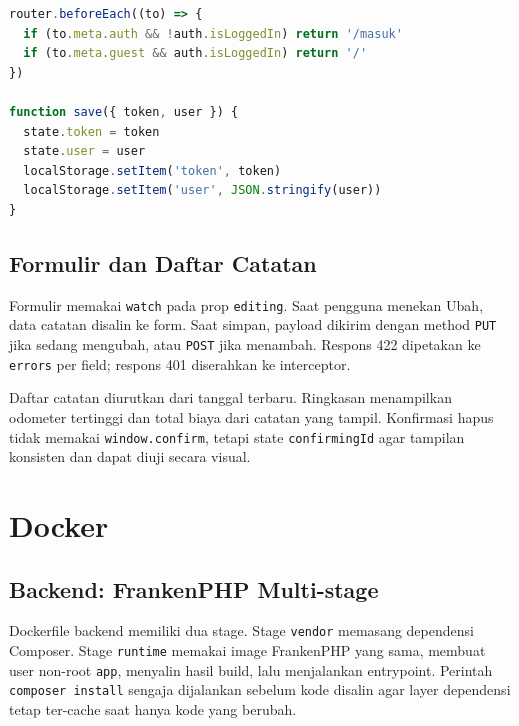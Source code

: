 \documentclass[12pt,a4paper,oneside]{book}
\begin{document}
\begin{lstlisting}[language=JavaScript,caption={Guard router dan penyimpanan sesi},label={kode:router}]
router.beforeEach((to) => {
  if (to.meta.auth && !auth.isLoggedIn) return '/masuk'
  if (to.meta.guest && auth.isLoggedIn) return '/'
})

function save({ token, user }) {
  state.token = token
  state.user = user
  localStorage.setItem('token', token)
  localStorage.setItem('user', JSON.stringify(user))
}
\end{lstlisting}

\subsection{Formulir dan Daftar Catatan}

Formulir memakai \texttt{watch} pada prop \texttt{editing}. Saat pengguna menekan
Ubah, data catatan disalin ke form. Saat simpan, payload dikirim dengan method
\texttt{PUT} jika sedang mengubah, atau \texttt{POST} jika menambah. Respons 422
dipetakan ke \texttt{errors} per field; respons 401 diserahkan ke interceptor.

Daftar catatan diurutkan dari tanggal terbaru. Ringkasan menampilkan odometer
tertinggi dan total biaya dari catatan yang tampil. Konfirmasi hapus tidak memakai
\texttt{window.confirm}, tetapi state \texttt{confirmingId} agar tampilan konsisten
dan dapat diuji secara visual.

\section{Docker}

\subsection{Backend: FrankenPHP Multi-stage}

Dockerfile backend memiliki dua stage. Stage \texttt{vendor} memasang dependensi
Composer. Stage \texttt{runtime} memakai image FrankenPHP yang sama, membuat user
non-root \texttt{app}, menyalin hasil build, lalu menjalankan entrypoint. Perintah
\texttt{composer install} sengaja dijalankan sebelum kode disalin agar layer
dependensi tetap ter-cache saat hanya kode yang berubah.
\end{document}
